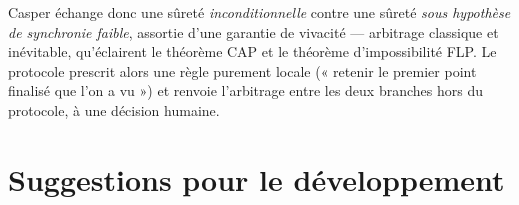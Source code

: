 \documentclass[11pt,a4paper]{article}
\theoremstyle{plain}
\theoremstyle{definition}
\begin{document}
Casper échange donc une sûreté \emph{inconditionnelle} contre une sûreté \emph{sous hypothèse
de synchronie faible}, assortie d'une garantie de vivacité — arbitrage classique et
inévitable, qu'éclairent le théorème CAP et le théorème d'impossibilité FLP. Le protocole
prescrit alors une règle purement locale (« retenir le premier point finalisé que l'on a
vu ») et renvoie l'arbitrage entre les deux branches hors du protocole, à une décision
humaine.

\section*{Suggestions pour le développement}

\noindent{}
\end{document}
